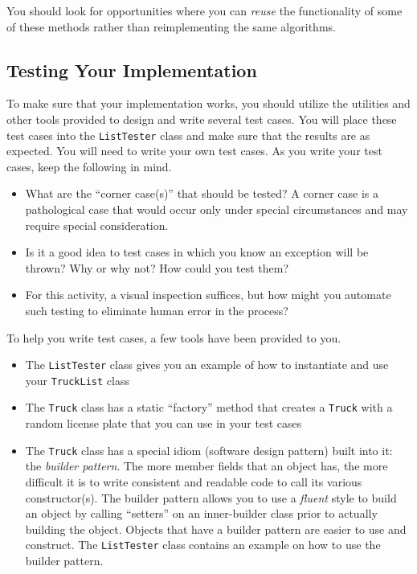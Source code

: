 \documentclass[12pt]{scrartcl}
\begin{document}
You should look for opportunities where you can \emph{reuse} the
functionality of some of these methods rather than reimplementing 
the same algorithms.

\subsection*{Testing Your Implementation}

To make sure that your implementation works, you should utilize the 
utilities and other tools provided to design and write several test 
cases.  You will place these test cases into the 
\texttt{ListTester} class and make sure that the results are 
as expected.  You will need to write your own test cases.  As you 
write your test cases, keep the following in mind.

\begin{itemize}
  \item What are the ``corner case(s)'' that should be tested?  A 
	corner case is a pathological case that would occur only under 
	special circumstances and may require special consideration.
  \item Is it a good idea to test cases in which you know an exception 
	will be thrown?  Why or why not?  How could you test them?
  \item For this activity, a visual inspection suffices, but how 
	might you automate such testing to eliminate human error in the 
	process?  
\end{itemize}

To help you write test cases, a few tools have been provided to you.

\begin{itemize}
  \item The \texttt{ListTester} class gives you an example 
    of how to instantiate and use your \texttt{TruckList} class
  \item The \texttt{Truck} class has a static ``factory'' 
    method that creates a \texttt{Truck} with a random 
    license plate that you can use in your test cases
  \item The \texttt{Truck} class has a special idiom 
    (software design pattern) built into it: the \emph{builder pattern}.  
    The more member fields that an object has, the more difficult it is to 
    write consistent and readable code to call its various constructor(s).  
    The builder pattern allows you to use a \emph{fluent} style to 
    build an object by calling ``setters'' on an inner-builder class 
    prior to actually building the object.  Objects that have a builder 
    pattern are easier to use and construct.  The 
    \texttt{ListTester} class contains an example on how to 
    use the builder pattern.
\end{itemize}
\end{document}
